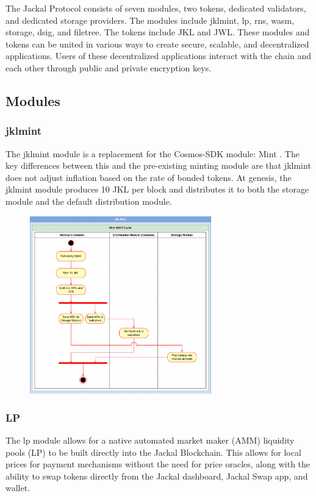 \documentclass[a4paper]{article}
\begin{document}
The Jackal Protocol consists of seven modules, two tokens, dedicated validators, and dedicated storage providers. The modules include jklmint, lp, rns, wasm, storage, dsig, and filetree. The tokens include JKL and JWL.  These modules and tokens can be united in various ways to create secure, scalable, and decentralized applications. Users of these decentralized applications interact with the chain and each other through public and private encryption keys.

\newpage
\subsection{Modules}
\subsubsection{jklmint}
The jklmint module is a replacement for the Cosmos-SDK module: Mint \cite{mint}. The key differences between this and the pre-existing minting module are that jklmint does not adjust inflation based on the rate of bonded tokens. At genesis, the jklmint module produces 10 JKL per block and distributes it to both the storage module and the default distribution module.

\begin{figure}[!htbp]
\centering
\includegraphics[width=0.7\textwidth]{assets/mint.png}
\end{figure}

\newpage

\subsubsection{LP}
The lp module allows for a native automated market maker (AMM) liquidity pools (LP) to be built directly into the Jackal Blockchain. This allows for local prices for payment mechanisms without the need for price oracles, along with the ability to swap tokens directly from the Jackal dashboard, Jackal Swap app, and wallet. 
\end{document}
